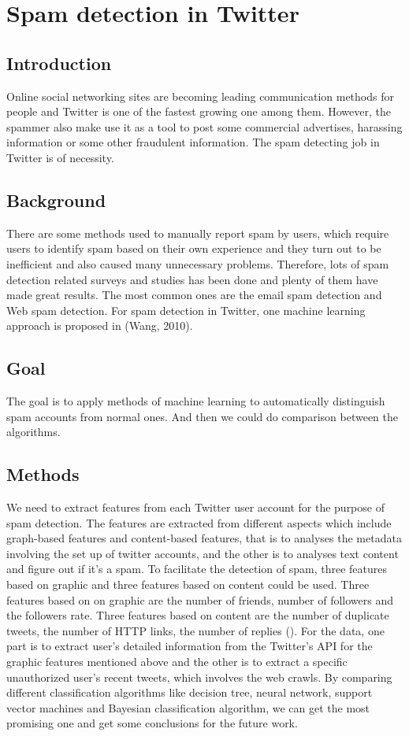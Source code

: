 \documentclass[../proposal.tex]{subfiles}
\begin{document}
\section{Spam detection in Twitter}

\subsection{Introduction}
Online social networking sites are becoming leading communication methods for
people and Twitter is one of the fastest growing one among them. However, the
spammer also make use it as a tool to post some commercial advertises,
harassing information or some other fraudulent information. The spam detecting
job in Twitter is of necessity.

\subsection{Background}
There are some methods used to manually report spam by users, which require
users to identify spam based on their own experience and they turn out to be
inefficient and also caused many unnecessary problems. Therefore, lots of spam
detection related surveys and studies has been done and plenty of them have
made great results. The most common ones are the email spam detection and Web
spam detection. For spam detection in Twitter, one machine learning approach is
proposed in (Wang, 2010).

\subsection{Goal}
The goal is to apply methods of machine learning to automatically distinguish
spam accounts from normal ones. And then we could do comparison between the
algorithms.

\subsection{Methods}
We need to extract features from each Twitter user account for the purpose of
spam detection. The features are extracted from different aspects which include
graph-based features and content-based features, that is to analyses the
metadata involving the set up of twitter accounts, and the other is to analyses
text content and figure out if it’s a spam. To facilitate the detection of
spam,  three features based on graphic and three features based on content
could be used. Three features based on on graphic are the number of friends,
number of followers and the followers rate. Three features based on content are
the number of duplicate tweets, the number of HTTP links, the number of
replies (\cite{wang2010don}). For the data, one part is to extract user's
detailed information from the Twitter's API for the graphic features mentioned
above and the other is to extract a specific unauthorized user's recent tweets,
which involves the web crawls. By comparing different classification algorithms
like decision tree, neural network, support vector machines and Bayesian
classification algorithm, we can get the most promising one and get some
conclusions for the future work.
\end{document}
